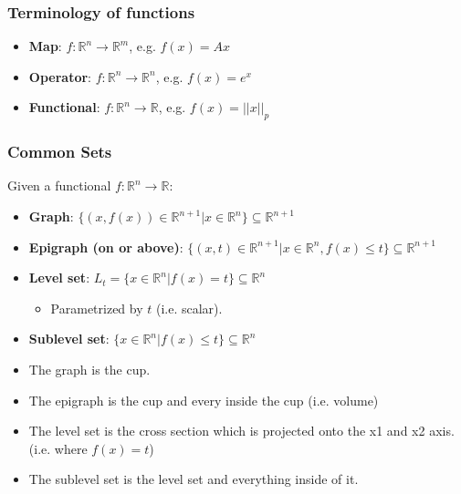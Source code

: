 \subsubsection{Terminology of functions}
\begin{definition}
    \begin{itemize}
        \item \textbf{Map}: $f: \mathbb{R}^n \to \mathbb{R}^m$, e.g. $f(x)=Ax$
        \item \textbf{Operator}: $f: \mathbb{R}^n \to \mathbb{R}^n$, e.g. $f(x) = e^x$
        \item \textbf{Functional}: $f: \mathbb{R}^n \to \mathbb{R}$, e.g. $f(x)=||x||_p$
    \end{itemize}
\end{definition}

\subsubsection{Common Sets}
\begin{definition}
    Given a functional $f: \mathbb{R}^n \to \mathbb{R}$:
    \begin{itemize}
        \item \textbf{Graph}: $\{ (x, f(x)) \in \mathbb{R}^{n+1} | x \in \mathbb{R}^n \} \subseteq \mathbb{R}^{n+1}$ 
        \item \textbf{Epigraph (on or above)}: $\{ (x, t) \in \mathbb{R}^{n+1} | x \in \mathbb{R}^n, f(x) \leq t \} \subseteq \mathbb{R}^{n+1} $
        \item \textbf{Level set}: $L_t = \{ x \in \mathbb{R}^n | f(x) = t \} \subseteq \mathbb{R}^n$
        \begin{itemize}
            \item Parametrized by $t$ (i.e. scalar).
        \end{itemize}
        \item \textbf{Sublevel set}: $\{ x \in \mathbb{R}^n | f(x) \leq t \} \subseteq \mathbb{R}^n$
    \end{itemize}
\end{definition}

\begin{example}
    \begin{itemize}
        \item The graph is the cup. 
        \item The epigraph is the cup and every inside the cup (i.e. volume)
        \item The level set is the cross section which is projected onto the x1 and x2 axis. (i.e. where $f(x)=t$) 
        \item The sublevel set is the level set and everything inside of it. 
    \end{itemize}
\end{example}


